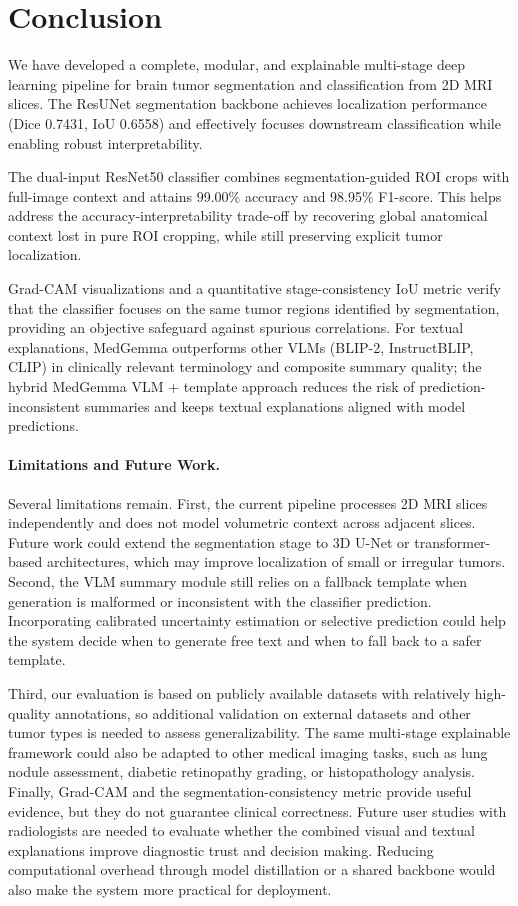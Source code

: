 \section{Conclusion}
We have developed a complete, modular, and explainable multi-stage deep learning pipeline for brain tumor segmentation and classification from 2D MRI slices. The ResUNet segmentation backbone achieves localization performance (Dice 0.7431, IoU 0.6558) and effectively focuses downstream classification while enabling robust interpretability. 

The dual-input ResNet50 classifier combines segmentation-guided ROI crops with full-image context and attains 99.00\% accuracy and 98.95\% F1-score. This helps address the accuracy-interpretability trade-off by recovering global anatomical context lost in pure ROI cropping, while still preserving explicit tumor localization.

Grad-CAM visualizations and a quantitative stage-consistency IoU metric verify that the classifier focuses on the same tumor regions identified by segmentation, providing an objective safeguard against spurious correlations. For textual explanations, MedGemma outperforms other VLMs (BLIP-2, InstructBLIP, CLIP) in clinically relevant terminology and composite summary quality; the hybrid MedGemma VLM + template approach reduces the risk of prediction-inconsistent summaries and keeps textual explanations aligned with model predictions.

\paragraph{Limitations and Future Work.}
Several limitations remain. First, the current pipeline processes 2D MRI slices independently and does not model volumetric context across adjacent slices. Future work could extend the segmentation stage to 3D U-Net or transformer-based architectures, which may improve localization of small or irregular tumors. Second, the VLM summary module still relies on a fallback template when generation is malformed or inconsistent with the classifier prediction. Incorporating calibrated uncertainty estimation or selective prediction could help the system decide when to generate free text and when to fall back to a safer template.

Third, our evaluation is based on publicly available datasets with relatively high-quality annotations, so additional validation on external datasets and other tumor types is needed to assess generalizability. The same multi-stage explainable framework could also be adapted to other medical imaging tasks, such as lung nodule assessment, diabetic retinopathy grading, or histopathology analysis. Finally, Grad-CAM and the segmentation-consistency metric provide useful evidence, but they do not guarantee clinical correctness. Future user studies with radiologists are needed to evaluate whether the combined visual and textual explanations improve diagnostic trust and decision making. Reducing computational overhead through model distillation or a shared backbone would also make the system more practical for deployment.